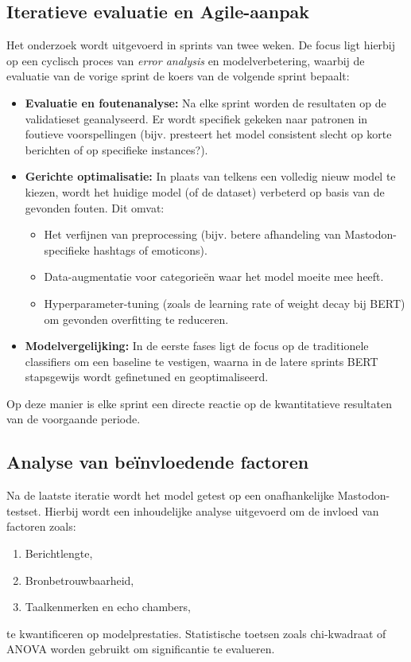 \subsection{Iteratieve evaluatie en Agile-aanpak}
Het onderzoek wordt uitgevoerd in sprints van twee weken. De focus ligt hierbij op een cyclisch proces van \textit{error analysis} en modelverbetering, waarbij de evaluatie van de vorige sprint de koers van de volgende sprint bepaalt:

\begin{itemize}
    \item \textbf{Evaluatie en foutenanalyse:} Na elke sprint worden de resultaten op de validatieset geanalyseerd. Er wordt specifiek gekeken naar patronen in foutieve voorspellingen (bijv. presteert het model consistent slecht op korte berichten of op specifieke instances?).
    \item \textbf{Gerichte optimalisatie:} In plaats van telkens een volledig nieuw model te kiezen, wordt het huidige model (of de dataset) verbeterd op basis van de gevonden fouten. Dit omvat:
    \begin{itemize}
        \item Het verfijnen van preprocessing (bijv. betere afhandeling van Mastodon-specifieke hashtags of emoticons).
        \item Data-augmentatie voor categorieën waar het model moeite mee heeft.
        \item Hyperparameter-tuning (zoals de learning rate of weight decay bij BERT) om gevonden overfitting te reduceren.
    \end{itemize}
    \item \textbf{Modelvergelijking:} In de eerste fases ligt de focus op de traditionele classifiers om een baseline te vestigen, waarna in de latere sprints BERT stapsgewijs wordt gefinetuned en geoptimaliseerd.
\end{itemize}
Op deze manier is elke sprint een directe reactie op de kwantitatieve resultaten van de voorgaande periode.

\subsection{Analyse van beïnvloedende factoren}
Na de laatste iteratie wordt het model getest op een onafhankelijke Mastodon-testset.
Hierbij wordt een inhoudelijke analyse uitgevoerd om de invloed van factoren zoals:
\begin{enumerate}[leftmargin=*]
    \item Berichtlengte,
    \item Bronbetrouwbaarheid,
    \item Taalkenmerken en echo chambers,
\end{enumerate}
te kwantificeren op modelprestaties. Statistische toetsen zoals chi-kwadraat of ANOVA worden gebruikt om significantie te evalueren.

